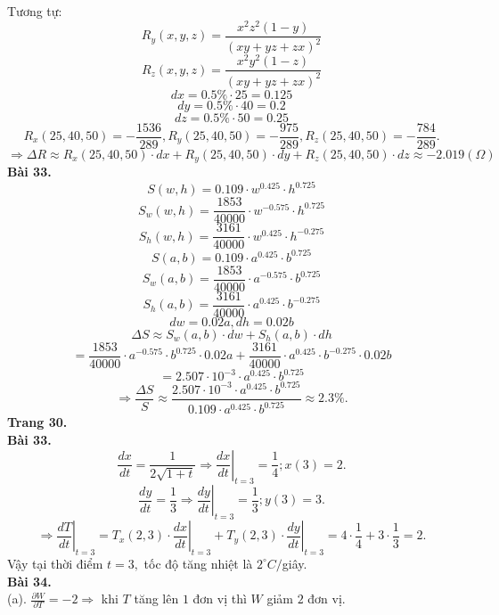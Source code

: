 \documentclass[12pt,a4paper]{article}
\begin{document}
Tương tự:
\[{R_y}\left( {x,y,z} \right) = \frac{{{x^2}{z^2}\left( {1 - y} \right)}}{{{{\left( {xy + yz + zx} \right)}^2}}}\]
\[{R_z}\left( {x,y,z} \right) = \frac{{{x^2}{y^2}\left( {1 - z} \right)}}{{{{\left( {xy + yz + zx} \right)}^2}}}\]
\[dx = 0.5\%  \cdot 25 = 0.125\]
\[dy = 0.5\%  \cdot 40 = 0.2\]
\[dz = 0.5\%  \cdot 50 = 0.25\]
\[{R_x}\left( {25,40,50} \right) =  - \frac{{1536}}{{289}},{R_y}\left( {25,40,50} \right) =  - \frac{{975}}{{289}},{R_z}\left( {25,40,50} \right) =  - \frac{{784}}{{289}}.\]
\[ \Rightarrow \Delta R \approx {R_x}\left( {25,40,50} \right) \cdot dx + {R_y}\left( {25,40,50} \right) \cdot dy + {R_z}\left( {25,40,50} \right) \cdot dz \approx  - 2.019\left( \Omega  \right)\]
\textbf{Bài 33.}
\[S\left( {w,h} \right) = 0.109 \cdot {w^{0.425}} \cdot {h^{0.725}}\]
\[{S_w}\left( {w,h} \right) = \frac{{1853}}{{40000}} \cdot {w^{ - 0.575}} \cdot {h^{0.725}}\]
\[{S_h}\left( {w,h} \right) = \frac{{3161}}{{40000}} \cdot {w^{0.425}} \cdot {h^{ - 0.275}}\]
\[S\left( {a,b} \right) = 0.109 \cdot {a^{0.425}} \cdot {b^{0.725}}\]
\[{S_w}\left( {a,b} \right) = \frac{{1853}}{{40000}} \cdot {a^{ - 0.575}} \cdot {b^{0.725}}\]
\[{S_h}\left( {a,b} \right) = \frac{{3161}}{{40000}} \cdot {a^{0.425}} \cdot {b^{ - 0.275}}\]
\[dw = 0.02a,dh = 0.02b\]
\[\Delta S \approx {S_w}\left( {a,b} \right) \cdot dw + {S_h}\left( {a,b} \right) \cdot dh\]
\[ = \frac{{1853}}{{40000}} \cdot {a^{ - 0.575}} \cdot {b^{0.725}} \cdot 0.02a + \frac{{3161}}{{40000}} \cdot {a^{0.425}} \cdot {b^{ - 0.275}} \cdot 0.02b\]
\[ = 2.507 \cdot {10^{ - 3}} \cdot {a^{0.425}} \cdot {b^{0.725}}\]
\[ \Rightarrow \frac{{\Delta S}}{S} \approx \frac{{2.507 \cdot {{10}^{ - 3}} \cdot {a^{0.425}} \cdot {b^{0.725}}}}{{0.109 \cdot {a^{0.425}} \cdot {b^{0.725}}}} \approx 2.3\% .\]
\textbf{Trang 30.}\\
\textbf{Bài 33.}
\[\frac{{dx}}{{dt}} = \frac{1}{{2\sqrt {1 + t} }} \Rightarrow {\left. {\frac{{dx}}{{dt}}} \right|_{t = 3}} = \frac{1}{4};x\left( 3 \right) = 2.\]
\[\frac{{dy}}{{dt}} = \frac{1}{3} \Rightarrow {\left. {\frac{{dy}}{{dt}}} \right|_{t = 3}} = \frac{1}{3};y\left( 3 \right) = 3.\]
\[{\left. { \Rightarrow \frac{{dT}}{{dt}}} \right|_{t = 3}} = {T_x}\left( {2,3} \right) \cdot {\left. {\frac{{dx}}{{dt}}} \right|_{t = 3}} + {T_y}\left( {2,3} \right) \cdot {\left. {\frac{{dy}}{{dt}}} \right|_{t = 3}} = 4 \cdot \frac{1}{4} + 3 \cdot \frac{1}{3} = 2.\]
Vậy tại thời điểm \(t = 3,\) tốc độ tăng nhiệt là \(2 ^ \circ C /\)giây.\\
\textbf{Bài 34.}\\
(a). \(\frac{{\partial W}}{{\partial T}} =  - 2 \Rightarrow \) khi \(T\) tăng lên \(1\) đơn vị thì \(W\) giảm \(2\) đơn vị.\\
\end{document}
